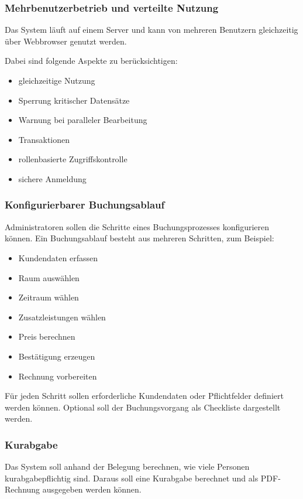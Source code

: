 \subsubsection{Mehrbenutzerbetrieb und verteilte Nutzung}

Das System läuft auf einem Server und kann von mehreren Benutzern gleichzeitig über Webbrowser genutzt werden.

Dabei sind folgende Aspekte zu berücksichtigen:

\begin{itemize}
\item gleichzeitige Nutzung
\item Sperrung kritischer Datensätze
\item Warnung bei paralleler Bearbeitung
\item Transaktionen
\item rollenbasierte Zugriffskontrolle
\item sichere Anmeldung
\end{itemize}

\subsubsection{Konfigurierbarer Buchungsablauf}

Administratoren sollen die Schritte eines Buchungsprozesses konfigurieren können. Ein Buchungsablauf besteht aus mehreren Schritten, zum Beispiel:

\begin{itemize}
\item Kundendaten erfassen
\item Raum auswählen
\item Zeitraum wählen
\item Zusatzleistungen wählen
\item Preis berechnen
\item Bestätigung erzeugen
\item Rechnung vorbereiten
\end{itemize}

Für jeden Schritt sollen erforderliche Kundendaten oder Pflichtfelder definiert werden können. Optional soll der Buchungsvorgang als Checkliste dargestellt werden.

\subsubsection{Kurabgabe}

Das System soll anhand der Belegung berechnen, wie viele Personen kurabgabepflichtig sind. Daraus soll eine Kurabgabe berechnet und als PDF-Rechnung ausgegeben werden können.

